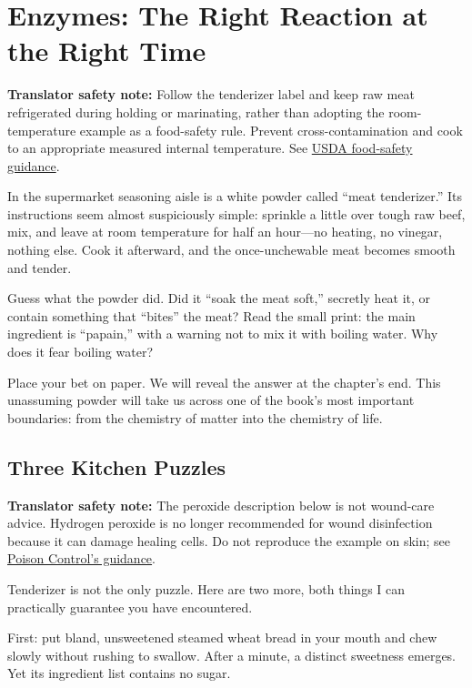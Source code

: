 \chapter{Enzymes: The Right Reaction at the Right Time}

\begin{kaichang}
\textbf{Translator safety note:} Follow the tenderizer label and keep raw meat refrigerated during holding or marinating, rather than adopting the room-temperature example as a food-safety rule. Prevent cross-contamination and cook to an appropriate measured internal temperature. See \href{https://www.fsis.usda.gov/food-safety/safe-food-handling-and-preparation/food-safety-basics/steps-keep-food-safe}{USDA food-safety guidance}.

In the supermarket seasoning aisle is a white powder called ``meat tenderizer.'' Its instructions seem almost suspiciously simple: sprinkle a little over tough raw beef, mix, and leave at room temperature for half an hour---no heating, no vinegar, nothing else. Cook it afterward, and the once-unchewable meat becomes smooth and tender.

Guess what the powder did. Did it ``soak the meat soft,'' secretly heat it, or contain something that ``bites'' the meat? Read the small print: the main ingredient is ``papain,'' with a warning not to mix it with boiling water. Why does it fear boiling water?

Place your bet on paper. We will reveal the answer at the chapter's end. This unassuming powder will take us across one of the book's most important boundaries: from the chemistry of matter into the chemistry of life.
\end{kaichang}

\section{Three Kitchen Puzzles}

\textbf{Translator safety note:} The peroxide description below is not wound-care advice. Hydrogen peroxide is no longer recommended for wound disinfection because it can damage healing cells. Do not reproduce the example on skin; see \href{https://www.poison.org/articles/hydrogen-peroxide}{Poison Control's guidance}.

Tenderizer is not the only puzzle. Here are two more, both things I can practically guarantee you have encountered.

First: put bland, unsweetened steamed wheat bread in your mouth and chew slowly without rushing to swallow. After a minute, a distinct sweetness emerges. Yet its ingredient list contains no sugar.

